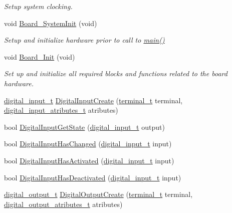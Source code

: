 \begin{DoxyCompactItemize}
\begin{DoxyCompactList}\small\item\em Setup system clocking. \end{DoxyCompactList}\item 
void \hyperlink{group__hal_gaeb60ea85499a4208167ae2540086516a}{Board\+\_\+\+System\+Init} (void)
\begin{DoxyCompactList}\small\item\em Setup and initialize hardware prior to call to \hyperlink{group__samples_ga840291bc02cba5474a4cb46a9b9566fe}{main()} \end{DoxyCompactList}\item 
void \hyperlink{group__hal_gae8d2d761b984f48c3dbb27dd32a8c119}{Board\+\_\+\+Init} (void)
\begin{DoxyCompactList}\small\item\em Set up and initialize all required blocks and functions related to the board hardware. \end{DoxyCompactList}\item 
\hyperlink{group__hal_gaa88780f43e331bbd1d6069d75ad68fcf}{digital\+\_\+input\+\_\+t} \hyperlink{group__hal_gab97f7c0af35e98c5f29ca3083b743d34}{Digital\+Input\+Create} (\hyperlink{group__hal_ga64d2a4cb83c256a6ace36ce64935997f}{terminal\+\_\+t} terminal, \hyperlink{group__hal_ga425db4b2c52be0608edec9a314976335}{digital\+\_\+input\+\_\+atributes\+\_\+t} atributes)
\item 
bool \hyperlink{group__hal_ga2ed2289f4350106d999d17788643f909}{Digital\+Input\+Get\+State} (\hyperlink{group__hal_gaa88780f43e331bbd1d6069d75ad68fcf}{digital\+\_\+input\+\_\+t} output)
\item 
bool \hyperlink{group__hal_gae975bb8941430b6bb04bd11b7714bed5}{Digital\+Input\+Has\+Changed} (\hyperlink{group__hal_gaa88780f43e331bbd1d6069d75ad68fcf}{digital\+\_\+input\+\_\+t} input)
\item 
bool \hyperlink{group__hal_ga811e1a571c3e6e539b3b61bae5698047}{Digital\+Input\+Has\+Activated} (\hyperlink{group__hal_gaa88780f43e331bbd1d6069d75ad68fcf}{digital\+\_\+input\+\_\+t} input)
\item 
bool \hyperlink{group__hal_gac75e3db7f366d04bbdaa6589a92d580c}{Digital\+Input\+Has\+Deactivated} (\hyperlink{group__hal_gaa88780f43e331bbd1d6069d75ad68fcf}{digital\+\_\+input\+\_\+t} input)
\item 
\hyperlink{group___plantilla_ga3e63b19d3d0dbfbfb2c50b3ac1f69aa0}{digital\+\_\+output\+\_\+t} \hyperlink{group__hal_ga594d436025e4739b9629e91e8e356206}{Digital\+Output\+Create} (\hyperlink{group__hal_ga64d2a4cb83c256a6ace36ce64935997f}{terminal\+\_\+t} terminal, \hyperlink{group__hal_ga52de0d94c690b3251abf626bc86dfed9}{digital\+\_\+output\+\_\+atributes\+\_\+t} atributes)

\end{DoxyCompactItemize}
